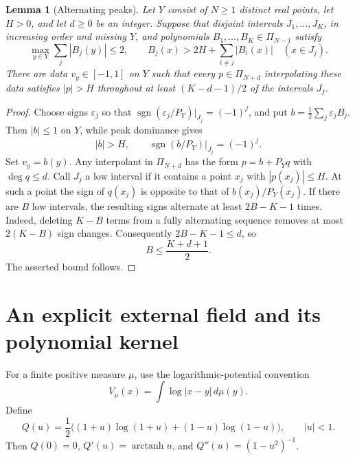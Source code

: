 \documentclass[11pt]{article}
\newtheorem{lemma}[theorem]{Lemma}
\theoremstyle{definition}
\numberwithin{equation}{section}
\DeclareMathOperator{\sgn}{sgn}
\DeclareMathOperator{\arctanh}{arctanh}
\begin{document}
\begin{lemma}[Alternating peaks]\label{lem:signs}
Let \(Y\) consist of \(N\ge1\) distinct real points, let \(H>0\),
and let \(d\ge0\) be an integer. Suppose that disjoint intervals
\(J_1,\ldots,J_K\), in increasing order and missing \(Y\), and
polynomials \(B_1,\ldots,B_K\in\Pi_{N-1}\) satisfy
\[
 \max_{y\in Y}\sum_j|B_j(y)|\le2,
 \qquad
 B_j(x)>2H+\sum_{i\ne j}|B_i(x)|\quad(x\in J_j).
\]
There are data \(v_y\in[-1,1]\) on \(Y\) such that every
\(p\in\Pi_{N+d}\) interpolating these data satisfies \(|p|>H\)
throughout at least \((K-d-1)/2\) of the intervals \(J_j\).
\end{lemma}

\begin{proof}
Choose signs \(\varepsilon_j\) so that
\(\sgn(\varepsilon_j/P_Y)|_{J_j}=(-1)^j\), and put
\(b=\frac12\sum_j\varepsilon_jB_j\).
Then \(|b|\le1\) on \(Y\), while peak dominance gives
\begin{equation}\label{eq:alternating-data}
 |b|>H,
 \qquad
 \sgn(b/P_Y)|_{J_j}=(-1)^j.
\end{equation}
Set \(v_y=b(y)\). Any interpolant in \(\Pi_{N+d}\) has the form
\(p=b+P_Yq\) with \(\deg q\le d\).
Call \(J_j\) a low interval if it contains a point \(x_j\) with
\(|p(x_j)|\le H\). At such a point the sign of \(q(x_j)\) is opposite
to that of \(b(x_j)/P_Y(x_j)\).
If there are \(B\) low intervals, the resulting signs alternate at
least \(2B-K-1\) times. Indeed, deleting \(K-B\) terms from a fully
alternating sequence removes at most \(2(K-B)\) sign changes.
Consequently \(2B-K-1\le d\), so
\begin{equation}\label{eq:low-interval-count}
 B\le\frac{K+d+1}{2}.
\end{equation}
The asserted bound follows.
\end{proof}

\section{An explicit external field and its polynomial kernel}
\label{sec:kernel}

For a finite positive measure \(\mu\), use the logarithmic-potential
convention
\[
 V_\mu(x)=\int\log|x-y|\,d\mu(y).
\]
Define
\begin{equation}\label{eq:field}
 Q(u)=\frac12\bigl((1+u)\log(1+u)+(1-u)\log(1-u)\bigr),
 \qquad |u|<1.
\end{equation}
Then \(Q(0)=0\), \(Q'(u)=\arctanh u\), and
\(Q''(u)=(1-u^2)^{-1}\).
\end{document}

